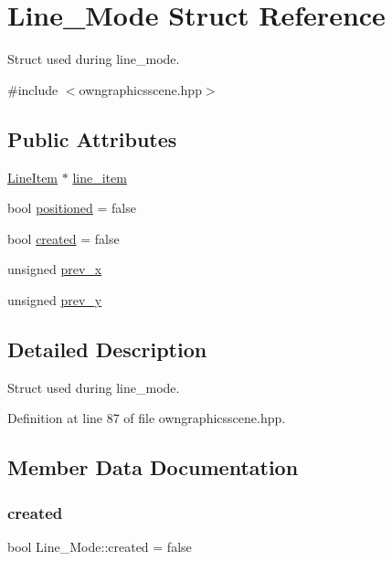 \hypertarget{structLine__Mode}{}\section{Line\+\_\+\+Mode Struct Reference}
\label{structLine__Mode}


Struct used during line\+\_\+mode.  




{\ttfamily \#include $<$owngraphicsscene.\+hpp$>$}

\subsection*{Public Attributes}
\begin{DoxyCompactItemize}
\item 
\mbox{\hyperlink{classLineItem}{Line\+Item}} $\ast$ \mbox{\hyperlink{structLine__Mode_a4e11b31f28505579f3dfcde54b27ecac}{line\+\_\+item}}
\item 
bool \mbox{\hyperlink{structLine__Mode_aefbb8555f406d47d742491003a6afde1}{positioned}} = false
\item 
bool \mbox{\hyperlink{structLine__Mode_ae48257668288a2a284bef66727fa68e5}{created}} = false
\item 
unsigned \mbox{\hyperlink{structLine__Mode_a8bbcbaff29a7810e066e99174e562371}{prev\+\_\+x}}
\item 
unsigned \mbox{\hyperlink{structLine__Mode_a8d5fb940f686955ead3f368a8d3b9016}{prev\+\_\+y}}
\end{DoxyCompactItemize}


\subsection{Detailed Description}
Struct used during line\+\_\+mode. 

Definition at line 87 of file owngraphicsscene.\+hpp.



\subsection{Member Data Documentation}
\mbox{\label{structLine__Mode_ae48257668288a2a284bef66727fa68e5}} 
\subsubsection{\texorpdfstring{created}{created}}
{\footnotesize\ttfamily bool Line\+\_\+\+Mode\+::created = false}

